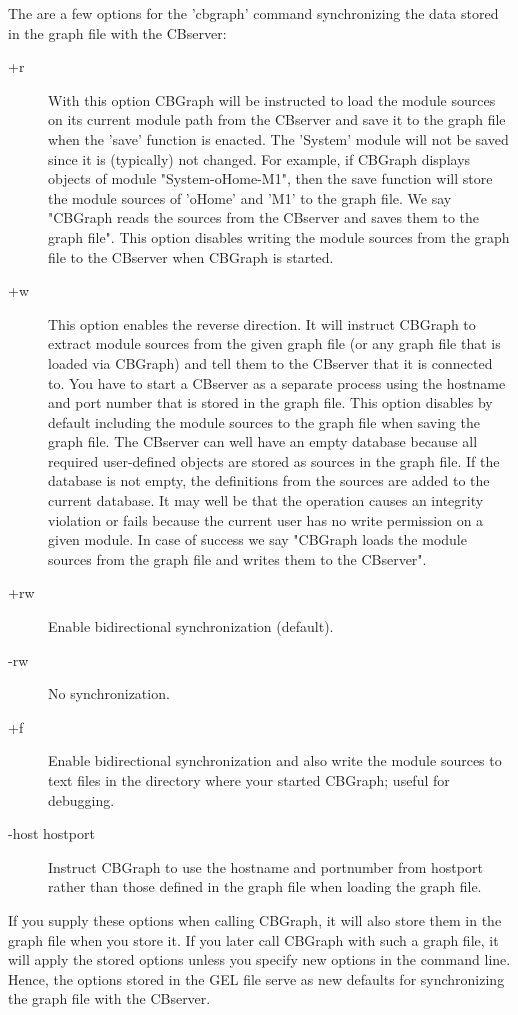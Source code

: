 The are a few options for the 'cbgraph' command synchronizing the data stored in the graph file
with the CBserver:
\begin{description}
\item[+r] With this option CBGraph will be instructed to load the module sources on its current module
  path from the CBserver and save it to the graph file when the 'save' function is enacted. 
  The 'System'  module will not be saved since it is (typically) not changed. For example, if CBGraph 
  displays objects of module "System-oHome-M1", then the save function will store the module sources
  of 'oHome'  and 'M1'  to the graph file. We say "CBGraph reads the sources from the CBserver and
  saves them to the graph file". This option disables writing the module sources from the graph file to the 
  CBserver when CBGraph is started.
\item[+w] This option enables the reverse direction. It will instruct CBGraph to extract module sources
  from the given graph file (or any graph file that is loaded via CBGraph) and tell them to the CBserver
  that it is connected to. You have to start a CBserver as a separate process using the hostname and
  port number that is stored in the graph file. This option disables by default including the module
  sources to the graph file when saving the graph file.
  The CBserver can well have an empty database because all required user-defined objects are stored
  as sources in the graph file. If the database is not empty, the definitions from the sources are
  added to the current database. It may well be that the operation causes an integrity violation or
  fails because the current user has no write permission on a given module. 
  In case of success we say "CBGraph loads the module sources from the graph file and writes
  them to the CBserver".
\item[+rw] Enable bidirectional synchronization  (default).
\item[-rw] No synchronization.
\item[+f]  Enable bidirectional synchronization and also write the module sources to text files in the directory
   where your started CBGraph; useful for debugging.
\item[-host hostport] Instruct CBGraph to use the hostname and portnumber from hostport rather than those
   defined in the graph file when loading the graph file.
\end{description}

If you supply these options when calling CBGraph, it will also store them in the graph file when you store it.
If you later call CBGraph with such a graph file, it will apply the stored options unless you specify
new options in the command line. Hence, the options stored in the GEL file serve as new defaults for
synchronizing the graph file with the CBserver.


